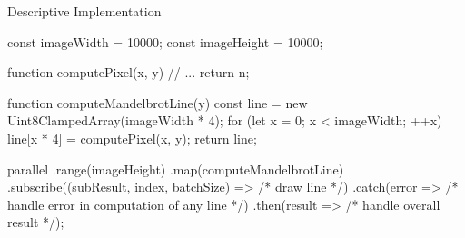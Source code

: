 \begin{frame}{Descriptive Implementation}
\begin{javascriptcode}
const imageWidth = 10000;
const imageHeight = 10000;

function computePixel(x, y) {
	// ...
	return n;
}

function computeMandelbrotLine(y) {
	const line = new Uint8ClampedArray(imageWidth * 4);
	for (let x = 0; x < imageWidth; ++x) {
		line[x * 4] = computePixel(x, y);
	}
	return line;
}

parallel
	.range(imageHeight) 
	.map(computeMandelbrotLine)	 
	.subscribe((subResult, index, batchSize) => /* draw line */)
	.catch(error => /* handle error in computation of any line */)
	.then(result => /* handle overall result */);
	\end{javascriptcode}
\end{frame}
